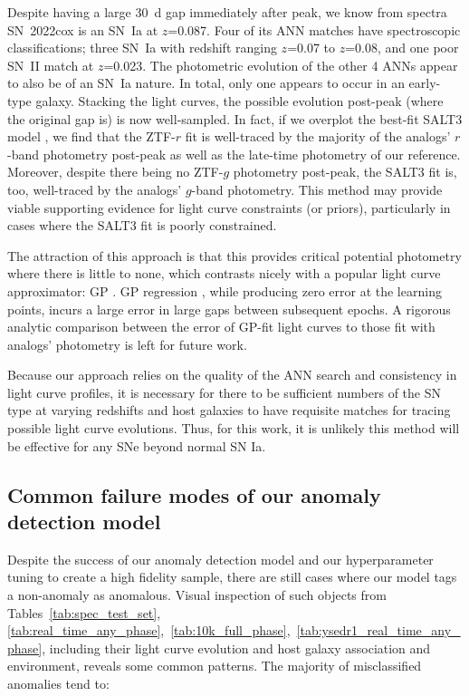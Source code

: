 \documentclass[twocolumn]{aastex63}
\begin{document}
Despite having a large 30~d gap immediately after peak, we know from spectra SN~2022cox is an SN~Ia at $z$=0.087. Four of its ANN matches have spectroscopic classifications; three SN~Ia with redshift ranging $z$=0.07 to $z$=0.08, and one poor SN~II match at $z$=0.023. The photometric evolution of the other 4 ANNs appear to also be of an SN~Ia nature. In total, only one appears to occur in an early-type galaxy. Stacking the light curves, the possible evolution post-peak (where the original gap is) is now well-sampled. In fact, if we overplot the best-fit SALT3 model \citep{Kenworthy2021}, we find that the ZTF-$r$ fit is well-traced by the majority of the analogs' $r$-band photometry post-peak as well as the late-time photometry of our reference. Moreover, despite there being no ZTF-$g$ photometry post-peak, the SALT3 fit is, too, well-traced by the analogs' $g$-band photometry. This method may provide viable supporting evidence for light curve constraints (or priors), particularly in cases where the SALT3 fit is poorly constrained.  \par

The attraction of this approach is that this provides critical potential photometry where there is little to none, which contrasts nicely with a popular light curve approximator: GP \citep{Boone2019,Demianenko2022,2022Gagliano_CCA}. GP regression \citep{Rasmussen2005}, while producing zero error at the learning points, incurs a large error in large gaps between subsequent epochs. A rigorous analytic comparison between the error of GP-fit light curves to those fit with analogs' photometry is left for future work. \par

Because our approach relies on the quality of the ANN search and consistency in light curve profiles, it is necessary for there to be sufficient numbers of the SN type at varying redshifts and host galaxies to have requisite matches for tracing possible light curve evolutions. Thus, for this work, it is unlikely this method will be effective for any SNe beyond normal SN Ia. \par


\subsection{Common failure modes of our anomaly detection model} \label{subsec:ad_failures}


Despite the success of our anomaly detection model and our hyperparameter tuning to create a high fidelity sample, there are still cases where our model tags a non-anomaly as anomalous. Visual inspection of such objects from Tables~\ref{tab:spec_test_set}, \ref{tab:real_time_any_phase},~\ref{tab:10k_full_phase},~\ref{tab:ysedr1_real_time_any_phase}, including their light curve evolution and host galaxy association and environment, reveals some common patterns. The majority of misclassified anomalies tend to:
\end{document}
